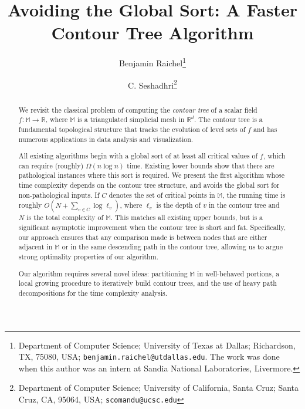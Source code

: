\documentclass[11pt]{article}
\theoremstyle{definition}
\newcommand{\MM}{\mathbb{M}}
\newcommand{\RR}{\mathbb{R}}
\newcommand{\si}[1]{#1}
\begin{document}
\author{
  Benjamin Raichel\thanks{%
      Department of Computer Science; %
      University of Texas at Dallas; %
      Richardson, TX, 75080, USA; %
      \texttt{\si{benjamin.raichel}@\si{utdallas}.\si{edu}}.
  The work was done when this author was an intern
  at Sandia National Laboratories, Livermore.}
  \and
  C. Seshadhri\thanks{%
        Department of Computer Science; %
      University of California, Santa Cruz; %
      Santa Cruz, CA, 95064, USA; %
      \texttt{\si{scomandu}@\si{ucsc}.\si{edu}} %
  }
}

\title{%
Avoiding the Global Sort: 
\break A Faster Contour Tree Algorithm%
}
\date{}

\maketitle
\thispagestyle{empty}


\begin{abstract}
We revisit the classical problem of computing the \emph{contour tree}
of a scalar field $f:\MM \to \RR$, where $\MM$ is a triangulated simplicial mesh in $\RR^d$. 
The contour tree is a fundamental topological structure that tracks
the evolution of level sets of $f$ and 
has numerous applications in data analysis and visualization.

All existing algorithms begin with a global sort of at least all critical values of $f$,
which can require (roughly) $\Omega(n\log n)$ time.
Existing lower bounds show that there are pathological instances where this sort is required.
We present the first algorithm whose time complexity depends
on the contour tree structure, and avoids the global sort for non-pathological inputs.
If $C$ denotes the set of critical points in $\MM$, the running time is
roughly $O(N+\sum_{v \in C} \log \ell_v)$, where $\ell_v$ is the depth of $v$ in the contour tree and $N$ is the total complexity of $\MM$.
This matches all existing upper bounds, but is a significant asymptotic improvement when the contour tree is short and fat.
Specifically, our approach ensures that any comparison made is between nodes that are either adjacent in $\MM$ 
or in the same descending path in the contour tree,
allowing us to argue strong optimality properties of our algorithm.

Our algorithm requires several novel ideas: partitioning $\MM$ in well-behaved portions, 
a local growing procedure to iteratively build contour trees, and the use of heavy path 
decompositions for the time complexity analysis. 
\end{abstract}
\end{document}
